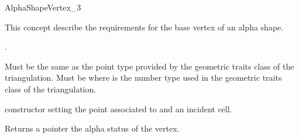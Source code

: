 \begin{ccRefConcept}{AlphaShapeVertex_3}

\ccDefinition
This concept describe the requirements for the base vertex of an alpha shape.


\ccRefines
{}.


\ccTypes
{}
{Must be the same as the point type provided by  
the geometric traits class of the triangulation.} 
 {Must be 
where  is the number type used in the geometric traits class
of the triangulation.}


\ccCreation
{}
\ccGlue
{}
\ccGlue
{} 
{constructor setting the point  associated to and an incident cell.}




\ccModifiers
{}
{Returns a pointer the alpha status of the vertex.}

\ccSeeAlso
{} 

\end{ccRefConcept}
